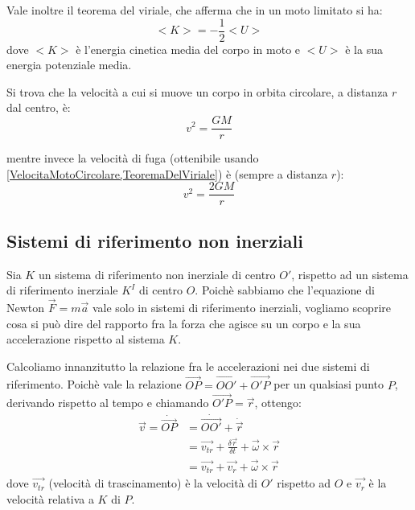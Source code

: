 \documentclass[../main.tex]{subfiles}
\begin{document}
Vale inoltre il teorema del viriale, che afferma che in un moto limitato si ha:
\begin{equation} \label{TeoremaDelViriale}
	<K>=-\frac{1}{2}<U>
\end{equation}
dove $<K>$ è l'energia cinetica media del corpo in moto e $<U>$ è la sua energia potenziale media.

Si trova che la velocità a cui si muove un corpo in orbita circolare, a distanza $r$ dal centro, è:
\begin{equation} \label{VelocitaMotoCircolare}
	v^2=\frac{GM}{r}
\end{equation}

mentre invece la velocità di fuga (ottenibile usando \cref{VelocitaMotoCircolare,TeoremaDelViriale}) è (sempre a distanza $r$):
\begin{equation} \label{VelocitaDiFuga}
	v^2=\frac{2GM}{r}
\end{equation}




\subsection{Sistemi di riferimento non inerziali}
Sia $K$ un sistema di riferimento non inerziale di centro $O'$, rispetto ad un sistema di riferimento
inerziale $K^I$ di centro $O$. Poichè sabbiamo che l'equazione di Newton $\vec{F}=m\vec{a}$
vale solo in sistemi di riferimento inerziali, vogliamo scoprire cosa si può dire del rapporto fra la forza
che agisce su un corpo e la sua accelerazione rispetto al sistema $K$.

Calcoliamo innanzitutto la relazione fra le accelerazioni nei due sistemi di riferimento. Poichè vale la
relazione $\overrightarrow{OP}=\overrightarrow{OO'}+\overrightarrow{O'P}$ per un qualsiasi punto $P$, derivando 
rispetto al tempo e chiamando $\overrightarrow{O'P}=\vec{r}$, ottengo:
\begin{equation}\label{VelNonInerziale}
\begin{split}
	\vec{v}=\dot{\overrightarrow{OP}}	& =\dot{\overrightarrow{OO'}}+\dot{\vec{r}}\\
													& =\overrightarrow{v_{tr}}+\frac{\delta \vec r}{\delta t}+\vec{\omega}\times\vec{r}\\
													& =\overrightarrow{v_{tr}}+\vec{v_r}+\vec{\omega}\times\vec{r}
\end{split}
\end{equation}
dove $\overrightarrow{v_{tr}}$ (velocità di trascinamento) è la velocità di $O'$ rispetto ad $O$ e $\overrightarrow{v_r}$ è la velocità relativa
a $K$ di $P$.
\end{document}
